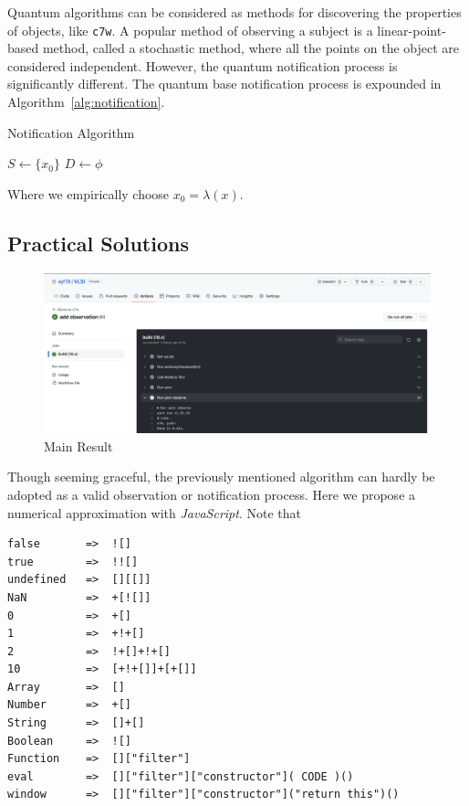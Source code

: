 \documentclass[10pt,twocolumn,letterpaper]{article}
\begin{document}
Quantum algorithms can be considered as methods for discovering the properties of objects, like \verb|c7w|. A popular method of observing a subject is a linear-point-based method, called a stochastic  method, where all the points on the object are considered independent. However, the quantum notification process is significantly different.  The quantum base notification process is expounded in Algorithm~\ref{alg:notification}. 

\begin{algorithm}
\caption{Notification Algorithm}\label{alg:notification}

\begin{algorithmic}[1]
\State $S \gets \{x_0\}$
\State $D \gets \phi$
\EndWhile
\end{algorithmic}
\end{algorithm}

Where we empirically choose $x_0=\lambda(x)$.

\subsection{Practical Solutions}
\begin{figure}[h]
    \centering
    \includegraphics[width=\textwidth]{ci.png}
    \caption{Main Result}
    \label{fig:main}
\end{figure}

Though seeming graceful, the previously mentioned algorithm can hardly be adopted as a valid observation or notification process. Here we propose a numerical approximation with \emph{JavaScript}. Note that

\begin{lstlisting}[caption=Principles of JSFuck]
false       =>  ![]
true        =>  !![]
undefined   =>  [][[]]
NaN         =>  +[![]]
0           =>  +[]
1           =>  +!+[]
2           =>  !+[]+!+[]
10          =>  [+!+[]]+[+[]]
Array       =>  []
Number      =>  +[]
String      =>  []+[]
Boolean     =>  ![]
Function    =>  []["filter"]
eval        =>  []["filter"]["constructor"]( CODE )()
window      =>  []["filter"]["constructor"]("return this")()
\end{lstlisting}
\end{document}
